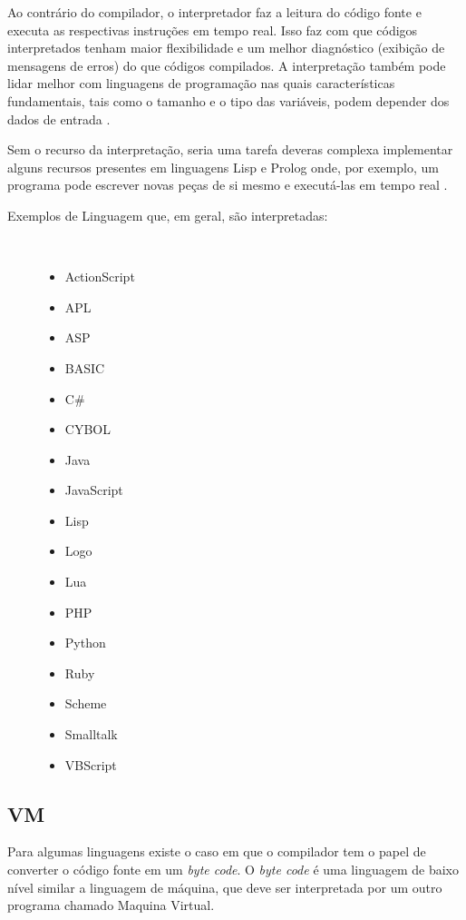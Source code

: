 Ao contrário do compilador, o interpretador faz a leitura do código fonte e 
executa  as respectivas instruções em tempo real. Isso faz com que  códigos 
interpretados tenham maior flexibilidade e um melhor diagnóstico (exibição de 
mensagens de erros) do que  códigos compilados. A interpretação também pode lidar 
melhor com linguagens de programação nas quais características fundamentais, 
tais como  o tamanho e  o tipo das variáveis, podem depender dos dados de 
entrada \cite{ref6}.

Sem  o recurso da interpretação, seria uma tarefa deveras complexa implementar 
alguns recursos  presentes em linguagens Lisp e Prolog onde, por exemplo, 
um programa pode escrever novas peças de si mesmo e executá-las em tempo real
 \cite{ref6}.

\begin{description}
    \item[Exemplos de Linguagem que, em geral, são interpretadas:]\
    \begin{itemize}
        \item ActionScript
        \item APL
        \item ASP
        \item BASIC
        \item C\#
        \item CYBOL
        \item Java
        \item JavaScript
        \item Lisp
        \item Logo
        \item Lua
        \item PHP
        \item Python
        \item Ruby
        \item Scheme
        \item Smalltalk
        \item VBScript
    \end{itemize}
\end{description}

\subsection{VM}

Para algumas linguagens existe o caso em que o compilador tem o papel
 de converter o código fonte em um \textit{byte code}\cite{ref9}. 
O \textit{byte code}
é uma linguagem de baixo nível  similar a linguagem de máquina, que 
deve ser interpretada por um outro programa chamado Maquina Virtual. 

